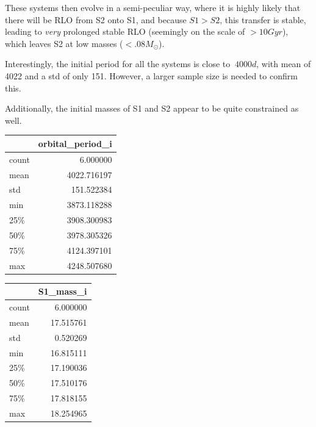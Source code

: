 \documentclass{article}
\theoremstyle{mytheoremstyle}
\theoremstyle{mytheoremstyle}
\theoremstyle{myproblemstyle}
\theoremstyle{myproblemstyle}
\newcounter{const}
\begin{document}
These systems then evolve in a semi-peculiar way, where it is highly likely that there will be RLO from S2 onto S1, and because \(S1 > S2\), this transfer is stable, leading to \textit{very} prolonged stable RLO (seemingly on the scale of  \(> 10 Gyr\)), which leaves S2 at low masses (\(< .08 M_\odot\)).

Interestingly, the initial period for all the systems is close to \(~4000 d\), with mean of 4022 and a std of only 151. However, a larger sample size is needed to confirm this.

Additionally, the initial masses of S1 and S2 appear to be quite constrained as well. 

\begin{table}[H]
\centering
  \begin{minipage}[t]{0.3\textwidth}
    \centering
    \begin{tabular}{|l|r|}
    \hline
    & orbital\_period\_i \\
    \hline
      count & 6.000000 \\
      mean & 4022.716197 \\
      std & 151.522384 \\
      min & 3873.118288 \\
      25\% & 3908.300983 \\
      50\% & 3978.305326 \\
      75\% & 4124.397101 \\
      max & 4248.507680 \\
    \hline
    \end{tabular}
  \end{minipage}
  \hfill
  \begin{minipage}[t]{0.3\textwidth}
    \centering
    \begin{tabular}{|l|r|}
    \hline
    & S1\_mass\_i \\
    \hline
      count & 6.000000 \\
      mean & 17.515761 \\
      std & 0.520269 \\
      min & 16.815111 \\
      25\% & 17.190036 \\
      50\% & 17.510176 \\
      75\% & 17.818155 \\
      max & 18.254965 \\
    \hline
    \end{tabular}
  \end{minipage}
  \hfill
  \begin{minipage}[t]{0.3\textwidth}

\end{minipage}
\end{table}
\end{document}
